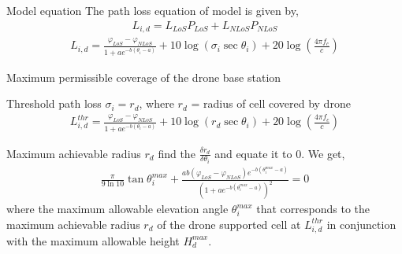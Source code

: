 \documentclass{beamer}
\begin{document}
\begin{frame}{}
\begin{block}{Model equation}
    The path loss equation of model is given by,
    \begin{align}
        L_{i, d} = L_{LoS}P_{LoS} + L_{NLoS}P_{NLoS}
    \end{align}
    \begin{align}
        L_{i, d} = \frac{\varphi_{LoS} - \varphi_{NLoS}}{1 + a e^{-b\left(\theta_i - a\right)}} + 10\log{\left(\sigma_{i}\sec{\theta_i}\right)} + 20\log{\left(\frac{4\pi f_{c}}{c}\right)}
    \end{align}
\end{block}
\end{frame}
\begin{frame}{Maximum permissible coverage of the drone base station}
\begin{block}{Threshold path loss}
    $\sigma_i = r_d$,
    where $r_d$ = radius of cell covered by drone
    \begin{align}
        L_{i, d}^{thr} = \frac{\varphi_{LoS} - \varphi_{NLoS}}{1 + a e^{-b\left(\theta_i - a\right)}} + 10\log{\left(r_d\sec{\theta_i}\right)} + 20\log{\left(\frac{4\pi f_{c}}{c}\right)}
    \end{align}
\end{block}
\begin{block}{Maximum achievable radius $r_d$}
    find the $\frac{\delta r_d}{\delta \theta_i}$ and equate it to $0$. We get,
    \begin{align}
        \frac{\pi}{9\ln{10}}\tan{}{\theta_i^{max}} + \frac{ab(\varphi_{LoS} - \varphi_{NLoS})e^{-b\left(\theta_i^{max} - a\right)}}{\left(1 + a e^{-b\left(\theta_i^{max} - a\right)}\right)^2} = 0
    \end{align}
    where the maximum allowable elevation angle $\theta_i^{max}$ that corresponds to the maximum achievable radius $r_d$ of the drone supported cell at $L_{i, d}^{thr}$ in conjunction with the maximum allowable height $H_d^{max}$.
\end{block}
\end{frame}
\end{document}
